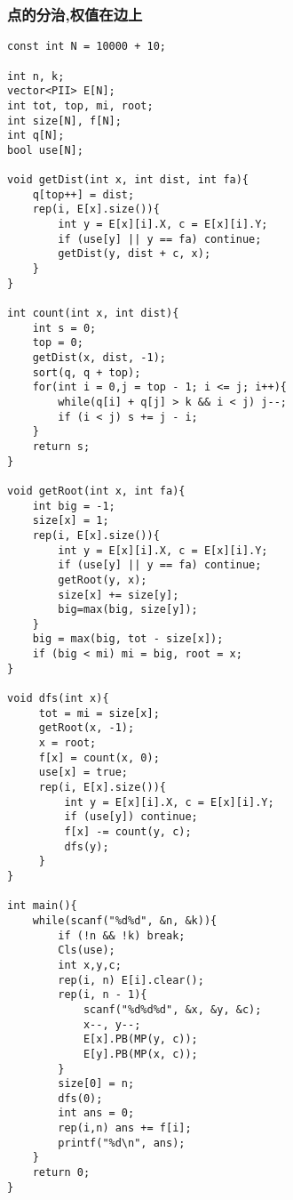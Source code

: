 \subsubsection{点的分治,权值在边上}
\begin{verbatim}
const int N = 10000 + 10;

int n, k;
vector<PII> E[N];
int tot, top, mi, root;
int size[N], f[N];
int q[N];
bool use[N];

void getDist(int x, int dist, int fa){
    q[top++] = dist;
    rep(i, E[x].size()){
        int y = E[x][i].X, c = E[x][i].Y;
        if (use[y] || y == fa) continue;
        getDist(y, dist + c, x);
    }
}

int count(int x, int dist){
    int s = 0;
    top = 0;
    getDist(x, dist, -1);
    sort(q, q + top);
    for(int i = 0,j = top - 1; i <= j; i++){
        while(q[i] + q[j] > k && i < j) j--;
        if (i < j) s += j - i;
    }
    return s;
}

void getRoot(int x, int fa){
    int big = -1;
    size[x] = 1;
    rep(i, E[x].size()){
        int y = E[x][i].X, c = E[x][i].Y;
        if (use[y] || y == fa) continue;
        getRoot(y, x);
        size[x] += size[y];
        big=max(big, size[y]);
    }
    big = max(big, tot - size[x]);
    if (big < mi) mi = big, root = x;
}

void dfs(int x){
     tot = mi = size[x];
     getRoot(x, -1);
     x = root;
     f[x] = count(x, 0);
     use[x] = true;
     rep(i, E[x].size()){
         int y = E[x][i].X, c = E[x][i].Y;
         if (use[y]) continue;
         f[x] -= count(y, c);
         dfs(y);
     }
}

int main(){
    while(scanf("%d%d", &n, &k)){
        if (!n && !k) break;
        Cls(use);
        int x,y,c;
        rep(i, n) E[i].clear();
        rep(i, n - 1){
            scanf("%d%d%d", &x, &y, &c);
            x--, y--;
            E[x].PB(MP(y, c));
            E[y].PB(MP(x, c));
        }
        size[0] = n;
        dfs(0);
        int ans = 0;
        rep(i,n) ans += f[i];
        printf("%d\n", ans);
    }
    return 0;
}
\end{verbatim}
